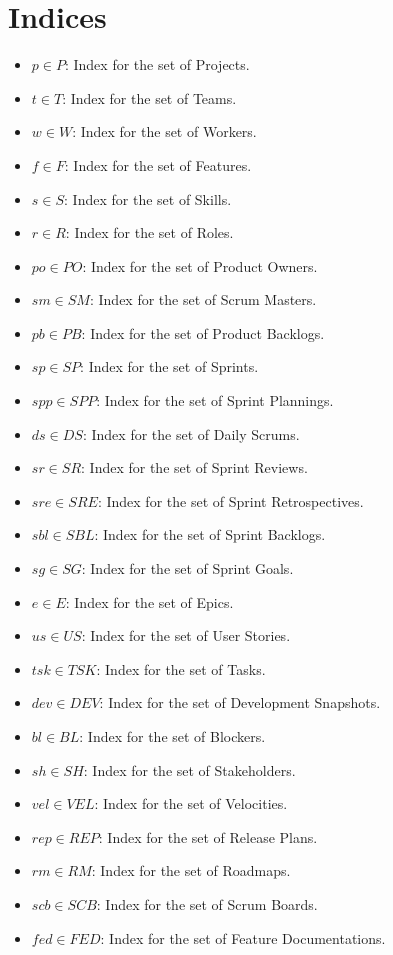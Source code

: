 \documentclass[11pt]{article}
\begin{document}
\section{Indices}
\label{sec:indices}
\begin{itemize}
    \item $p \in P$: Index for the set of Projects.
    \item $t \in T$: Index for the set of Teams.
    \item $w \in W$: Index for the set of Workers.
    \item $f \in F$: Index for the set of Features.
    \item $s \in S$: Index for the set of Skills.
    \item $r \in R$: Index for the set of Roles.
    \item $po \in PO$: Index for the set of Product Owners.
    \item $sm \in SM$: Index for the set of Scrum Masters.
    \item $pb \in PB$: Index for the set of Product Backlogs.
    \item $sp \in SP$: Index for the set of Sprints.
    \item $spp \in SPP$: Index for the set of Sprint Plannings.
    \item $ds \in DS$: Index for the set of Daily Scrums.
    \item $sr \in SR$: Index for the set of Sprint Reviews.
    \item $sre \in SRE$: Index for the set of Sprint Retrospectives.
    \item $sbl \in SBL$: Index for the set of Sprint Backlogs.
    \item $sg \in SG$: Index for the set of Sprint Goals.
    \item $e \in E$: Index for the set of Epics.
    \item $us \in US$: Index for the set of User Stories.
    \item $tsk \in TSK$: Index for the set of Tasks.
    \item $dev \in DEV$: Index for the set of Development Snapshots.
    \item $bl \in BL$: Index for the set of Blockers.
    \item $sh \in SH$: Index for the set of Stakeholders.
    \item $vel \in VEL$: Index for the set of Velocities.
    \item $rep \in REP$: Index for the set of Release Plans.
    \item $rm \in RM$: Index for the set of Roadmaps.
    \item $scb \in SCB$: Index for the set of Scrum Boards.
    \item $fed \in FED$: Index for the set of Feature Documentations.
\end{itemize}
\end{document}
